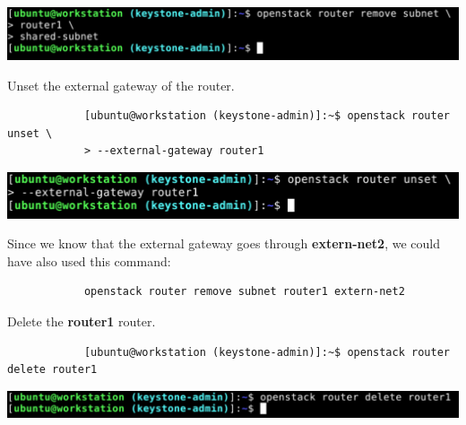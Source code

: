\documentclass[letterpaper, 12pt]{article}
\begin{document}
\begin{enumerate}
\begin{labstep}
        \begin{center}
            \includegraphics[width=\linewidth]{images/part2/step10.png}
        \end{center}
    \end{labstep}

    \begin{labstep}
        Unset the external gateway of the router.
        \begin{lstlisting}
            [ubuntu@workstation (keystone-admin)]:~$ openstack router unset \
            > --external-gateway router1
        \end{lstlisting}

        \begin{center}
            \includegraphics[width=\linewidth]{images/part2/step11.png}
        \end{center}
    \end{labstep}

    \begin{tipbox}
        Since we know that the external gateway goes through \textbf{extern-net2}, we could have also used this command:
        \begin{lstlisting}
            openstack router remove subnet router1 extern-net2
        \end{lstlisting}
    \end{tipbox}

    \begin{labstep}
        Delete the \textbf{router1} router.
        \begin{lstlisting}
            [ubuntu@workstation (keystone-admin)]:~$ openstack router delete router1
        \end{lstlisting}

        \begin{center}
            \includegraphics[width=\linewidth]{images/part2/step12.png}
        \end{center}
    \end{labstep}


\end{enumerate}
\end{document}
